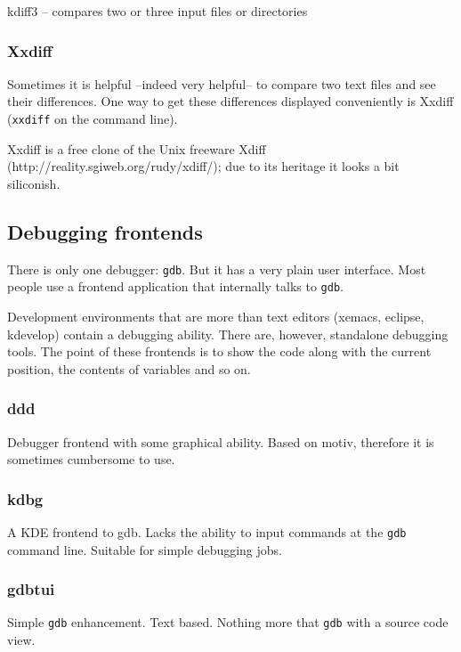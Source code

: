 kdiff3 -- compares two or three input files or directories

\subsubsection{Xxdiff}

Sometimes it is helpful --indeed very helpful-- to compare two text
files and see their differences. One way to get these differences
displayed conveniently is Xxdiff (\texttt{xxdiff} on the command line).

Xxdiff is a free clone of the Unix freeware Xdiff (http://reality.sgiweb.org/rudy/xdiff/);
due to its heritage it looks a bit siliconish.






\subsection{Debugging frontends}

There is only one debugger: \texttt{gdb}. But it has a very plain
user interface. Most people use a frontend application that internally
talks to \texttt{gdb}.

Development environments that are more than text editors (xemacs,
eclipse, kdevelop) contain a debugging ability. There are, however,
standalone debugging tools. The point of these frontends is to show
the code along with the current position, the contents of variables
and so on.


\subsubsection{ddd}

Debugger frontend with some graphical ability. Based on motiv, therefore
it is sometimes cumbersome to use.


\subsubsection{kdbg}

A KDE frontend to gdb. Lacks the ability to input commands at the
\texttt{gdb} command line. Suitable for simple debugging jobs.


\subsubsection{gdbtui}

Simple \texttt{gdb} enhancement. Text based. Nothing more that \texttt{gdb}
with a source code view.


